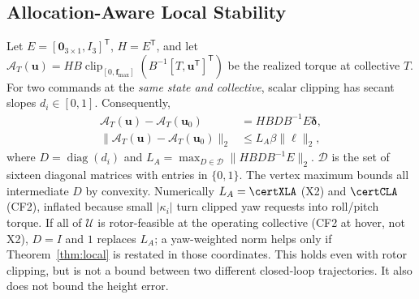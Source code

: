 \documentclass[letterpaper, 10 pt, conference]{ieeeconf}
\newcommand{\T}{^{\mathsf T}}
\newcommand{\clip}{\operatorname{clip}}
\begin{document}
\subsection{Allocation-Aware Local Stability}
\label{sec:local}
Let $E=[\bm0_{3\times1},I_3]\T$, $H=E\T$, and let
$\mathcal A_T(\bm u)=HB\clip_{[0,\bm f_{\max}]}(B^{-1}[T,\bm u\T]\T)$
be the realized torque at collective $T$. For two commands at the
\emph{same state and collective}, scalar clipping has secant slopes
$d_i\in[0,1]$. Consequently,
\begin{align}
 \mathcal A_T(\bm u)-\mathcal A_T(\bm u_0)
 &=HBDB^{-1}E\bm\delta,\\
 \|\mathcal A_T(\bm u)-\mathcal A_T(\bm u_0)\|_2
 &\le L_A\beta\|\bm\ell\|_2,
 \label{eq:allocbound}
\end{align}
where $D=\operatorname{diag}(d_i)$ and
$L_A=\max_{D\in\mathcal D}\|HBDB^{-1}E\|_2$.
$\mathcal D$ is the set of sixteen diagonal matrices with entries
in $\{0,1\}$. The vertex maximum bounds all intermediate $D$ by convexity.
Numerically $L_A=\certXLA$ (X2) and $\certCLA$ (CF2), inflated because
small $|\kappa_i|$ turn clipped yaw requests into roll/pitch torque. If all
of $\mathcal U$ is rotor-feasible at the operating collective (CF2 at hover,
not X2), $D=I$ and $1$ replaces $L_A$; a yaw-weighted norm helps only if
Theorem~\ref{thm:local} is restated in those coordinates.
This holds even with rotor clipping, but is not a bound between two
different closed-loop trajectories. It also does not bound the height error.
\end{document}
